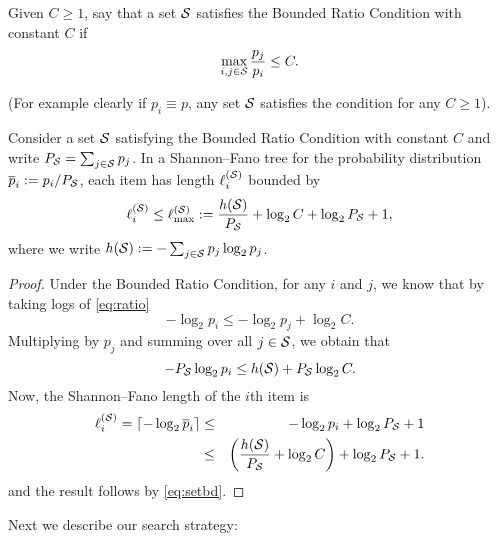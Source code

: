 \begin{condition} \label{cond:ratio}
Given $C \geq 1$, say that a set ${\mathcal{S}}$ satisfies the Bounded Ratio Condition with constant $C$ if
\begin{equation} \label{eq:ratio} \max_{i,j \in {\mathcal{S}}} \frac{p_j}{p_i} \leq C.\end{equation} \end{condition}
%
(For example clearly if $p_i \equiv p$, any set ${\mathcal{S}}$ satisfies the condition for any $C \geq 1$).
%
\begin{lemma} \label{lem:sfstep}
Consider a set ${\mathcal{S}}$ satisfying the Bounded Ratio Condition  with constant $C$
and write $P_{{\mathcal{S}}} = \sum_{j \in {\mathcal{S}}} p_j$.
In a  Shannon--Fano tree for the probability distribution $\overline{p}_i := p_i/P_{{\mathcal{S}}}$, each item has length $\ell_i^{({\mathcal{S}})}$
bounded by
\begin{equation} \label{eq:depth} \ell_i^{({\mathcal{S}})} \leq \ell_{\max}^{({\mathcal{S}})} := \frac{h({\mathcal{S}})}{P_{{\mathcal{S}}}} + \log_2  C + \log_2  P_{{\mathcal{S}}} + 1,\end{equation}
where we write $h( {\mathcal{S}}) :=  -\sum_{j \in {\mathcal{S}}} p_j \log_2  p_j$.
\end{lemma}
\begin{proof} Under the Bounded Ratio Condition, for any $i$ and $j$, we know that by taking logs of \eqref{eq:ratio}
$$ -\log_2 p_i \leq - \log_2 p_j + \log_2 C.$$
Multiplying by $p_j$ and summing over all $j \in {\mathcal{S}}$, we obtain that
\begin{equation} \label{eq:setbd} -P_{{\mathcal{S}}} \log_2 p_i \leq h({\mathcal{S}}) + P_{{\mathcal{S}}} \log_2 C.\end{equation}
Now, the Shannon--Fano length of the $i$th item is
\begin{eqnarray}
 \ell_i^{({\mathcal{S}})}  = \lceil -\log_2 \overline{p}_i \rceil 
& \leq &  -\log_2 p_i + \log_2 P_{{\mathcal{S}}} + 1 \label{eq:lengthbd} \\
& \leq  & \left(\frac{h({\mathcal{S}})}{P_{{\mathcal{S}}}} + \log_2 C \right) + \log_2 P_{{\mathcal{S}}} + 1. \nonumber
\end{eqnarray}
and the result follows by \eqref{eq:setbd}.
\end{proof}

Next we describe our search strategy:

